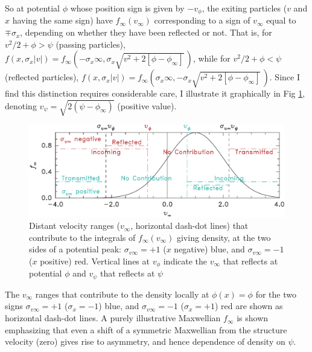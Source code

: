 \documentclass[pre]{revtex4-2}
\begin{document}
So at potential $\phi$ whose position sign is given by $-v_\phi$, the
exiting particles ($v$ and $x$ having the same sign) have
$f_\infty(v_\infty)$ corresponding to a sign of $v_\infty$ equal to
$\mp \sigma_x$, depending on whether they have been reflected or not.
That is, for $v^2/2+\phi>\psi$ (passing particles),
$f(x,\sigma_x|v|)=
f_\infty(-\sigma_x\infty,\sigma_x\sqrt{v^2+2[\phi-\phi_\infty]}\,)$,
while for $v^2/2+\phi<\psi$ (reflected particles),
$f(x,\sigma_x|v|)=
f_\infty(\sigma_x\infty,-\sigma_x\sqrt{v^2+2[\phi-\phi_\infty]}\,)$. Since
I find this distinction requires considerable care, I illustrate it
graphically in Fig \ref{contribs}, denoting
$v_\psi=\sqrt{2(\psi-\phi_\infty)}$ (positive value).
\begin{figure}[htp]
\centering
\includegraphics[width=.8\hsize]{contribs}  
\caption{Distant velocity ranges ($v_\infty$, horizontal dash-dot
  lines) that contribute to the integrals of $f_\infty(v_\infty)$
  giving density, at the two sides of a potential peak: $\sigma_{v\infty}=+1$
  ($x$ negative) blue, and $\sigma_{v\infty}=-1$ ($x$ positive) red. Vertical
  lines at $v_\phi$ indicate the $v_\infty$ that reflects at potential
  $\phi$ and $v_\psi$ that reflects at $\psi$ }\label{contribs}
\end{figure}
The $v_\infty$ ranges that contribute to the
density locally at $\phi(x)=\phi$ for the two signs $\sigma_{v\infty}=+1$
($\sigma_x=-1$) blue, and $\sigma_{v\infty}=-1$ ($\sigma_x=+1$) red are
shown as horizontal dash-dot lines.
 A purely
illustrative Maxwellian $f_\infty$ is shown emphasizing that even a
shift of a symmetric Maxwellian from the structure velocity (zero)
gives rise to asymmetry, and hence dependence of density on $\psi$. 
\end{document}
